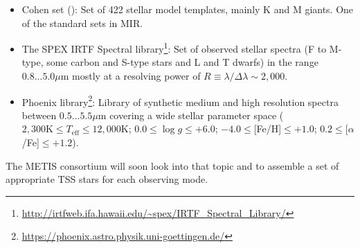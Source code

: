\begin{itemize}
    \item Cohen set (\cite{coh99}): Set of 422 stellar model templates, mainly K and M giants. One of the standard sets in \ac{MIR}.
    \item The SPEX \ac{IRTF} Spectral library\footnote{\url{http://irtfweb.ifa.hawaii.edu/~spex/IRTF_Spectral_Library/}}: Set of observed stellar spectra (F to M-type, some carbon and S-type stars and L and T dwarfs) in the range $0.8...5.0\mu$m mostly at a resolving power of $R\equiv\lambda/\Delta\lambda\sim2,000$.
    \item Phoenix library\footnote{\url{https://phoenix.astro.physik.uni-goettingen.de/}}\cite{phoenix}: Library of synthetic medium and high resolution spectra between $0.5...5.5\mu$m covering a wide stellar parameter space ($2,300\textrm{K}\leq T_\textrm{eff}\leq12,000\textrm{K}$; $0.0\leq\log g\leq+6.0$; $-4.0\leq$[Fe/H]$\leq+1.0$; $0.2\leq$[$\alpha$/Fe]$\leq+1.2$). \\
\end{itemize}
The \ac{METIS} consortium will soon look into that topic and to assemble a set of appropriate \ac{TSS} stars for each observing mode.

